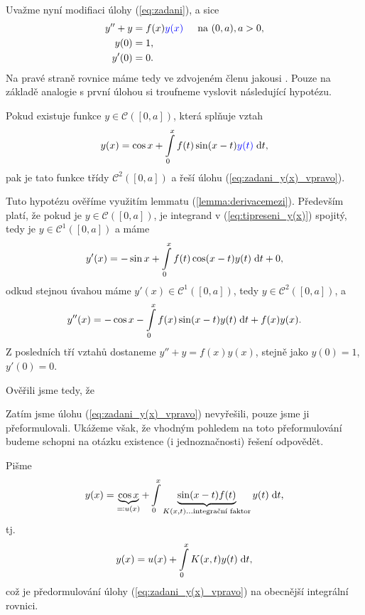 Uvažme nyní modifiaci úlohy (\ref{eq:zadani}), a sice 
\begin{equation}
    \begin{split}
        y''+y&=f(x)\textcolor{blue}{y(x)} \text{\;\;\;\; na } (0,a), a>0,\\
        y(0)&=1,\\
        y'(0)&=0.
    \end{split}
    \label{eq:zadani_y(x)_vpravo}
\end{equation}
Na pravé straně rovnice máme tedy ve zdvojeném členu jakousi . Pouze na základě analogie s první úlohou si troufneme vyslovit následující hypotézu.

Pokud existuje funkce $y\in\mathcal{C}( [0,a] )$, která splňuje vztah
\begin{equation}
    y(x) = \cos x + \int\limits_0^x f(t)\sin(x-t)\textcolor{blue}{y(t)}\;\mathrm{d}t,
    \label{eq:tipreseni_y(x)}
\end{equation}
pak je tato funkce třídy $\mathcal{C}^2( [0,a] )$ a řeší úlohu (\ref{eq:zadani_y(x)_vpravo}).

Tuto hypotézu ověříme využitím lemmatu (\ref{lemma:derivacemezi}). Především platí, že pokud je $y\in \mathcal{C}([0,a])$, je integrand v (\ref{eq:tipreseni_y(x)}) spojitý, tedy je $y\in\mathcal{C}^1([0,a])$ a máme
\begin{equation}
    y'(x) = -\sin x + \int\limits_0^x f(t)\cos(x-t)y(t)\;\mathrm{d}t + 0,
\end{equation}
odkud stejnou úvahou máme $y'(x)\in\mathcal{C}^1([0,a])$, tedy $y\in\mathcal{C}^2([0,a])$, a 
\begin{equation}
    y''(x) = -\cos x -\int\limits_0^x f(x) \sin(x-t)y(t)\;\mathrm{d}t + f(x)y(x).
\end{equation}
Z posledních tří vztahů dostaneme $y''+y=f(x)y(x)$, stejně jako $y(0)=1$, $y'(0)=0$.

Ověřili jsme tedy, že
\begin{figure}[h!]
    \centering
\end{figure}
Zatím jsme úlohu (\ref{eq:zadani_y(x)_vpravo}) nevyřešili, pouze jsme ji přeformulovali. Ukážeme však, že vhodným pohledem na toto přeformulování budeme schopni na otázku existence (i jednoznačnosti) řešení odpovědět.

Pišme 
\begin{equation}
    y(x)=\underbrace{\cos x}_{\eqqcolon u(x)} + \int\limits_0^x \underbrace{\sin(x-t)f(t)}_{K(x,t)\hdots \text{integrační faktor}} y(t) \;\mathrm{d}t ,
\end{equation}
tj. 
\begin{equation}
    y(x) = u(x) + \int\limits_0^xK(x,t)y(t)\;\mathrm{d}t,
    \label{eq:zadani_preformulovano}
\end{equation}
což je předormulování úlohy (\ref{eq:zadani_y(x)_vpravo}) na obecnější integrální rovnici.

